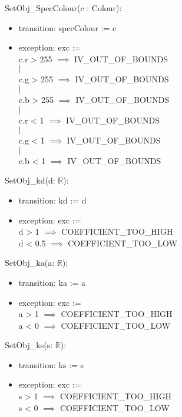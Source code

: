 \documentclass[12pt, titlepage]{article}
\begin{document}
\noindent SetObj\_SpecColour(c : Colour):
\begin{itemize}
	\item transition: specColour := c
	\item exception: exc := {\\
					c.r > 255 $\implies$ IV\_OUT\_OF\_BOUNDS\\
					$|$ \\
					c.g > 255 $\implies$ IV\_OUT\_OF\_BOUNDS \\
					$|$ \\
					c.b > 255 $\implies$ IV\_OUT\_OF\_BOUNDS	\\
					$|$ \\
					c.r < 1 $\implies$ IV\_OUT\_OF\_BOUNDS\\
					$|$ \\
					c.g < 1 $\implies$ IV\_OUT\_OF\_BOUNDS \\
					$|$ \\
					c.b < 1 $\implies$ IV\_OUT\_OF\_BOUNDS}	\\	 
\end{itemize}

\noindent SetObj\_kd(d: $\mathbb{R}$):
\begin{itemize}
	\item transition: kd := d
	\item exception: exc := {\\
		d > 1 $\implies$ COEFFICIENT\_TOO\_HIGH\\
		d < 0.5 $\implies$ COEFFICIENT\_TOO\_LOW\\}
\end{itemize}

\noindent SetObj\_ka(a: $\mathbb{R}$):
\begin{itemize}
	\item transition: ka := a
	\item exception: exc := {\\
		a > 1 $\implies$ COEFFICIENT\_TOO\_HIGH\\
		a < 0 $\implies$ COEFFICIENT\_TOO\_LOW\\}
\end{itemize}

\noindent SetObj\_ks(s: $\mathbb{R}$):
\begin{itemize}
	\item transition: ks := s
	\item exception: exc := {\\
		s > 1 $\implies$ COEFFICIENT\_TOO\_HIGH\\
		s < 0 $\implies$ COEFFICIENT\_TOO\_LOW\\}
\end{itemize}
\end{document}
